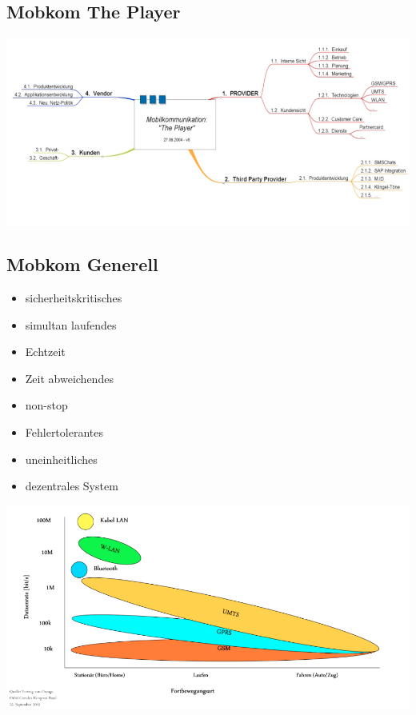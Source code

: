 \subsection{Mobkom The Player}

\includegraphics[height = 5 cm]{./Pics/MobKomThePlayer}

\subsection{Mobkom Generell}
\begin{minipage}{0.5 \linewidth}
\begin{itemize}
\item sicherheitskritisches 
\item simultan laufendes
\item Echtzeit
\item Zeit abweichendes
\item non-stop
\item Fehlertolerantes
\item  uneinheitliches
\item dezentrales System
\end{itemize}
\end{minipage}
\begin{minipage}{0.5 \linewidth}
\includegraphics[width = \linewidth]{./Pics/Technologien}
\end{minipage}

